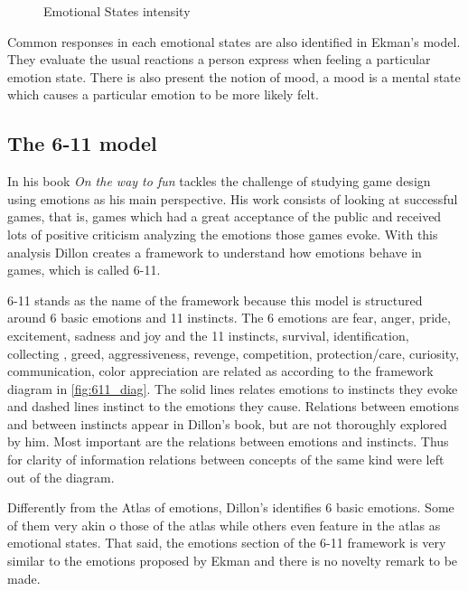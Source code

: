 \begin{figure}[!h]
    \caption{Emotional States intensity}
    \label{fig:emotionalstates}
\end{figure}


Common responses in each emotional states are also identified in Ekman's model. They evaluate the usual reactions a person express when feeling a particular emotion state. There is also present the notion of mood, a mood is a mental state which causes a particular emotion to be more likely felt. 

\subsection{The 6-11 model}

In his book \textit{On the way to fun} \citeauthor{dillon_way_2010} tackles the challenge of studying game design using emotions as his main perspective. His work consists of looking at successful games, that is, games which had a great acceptance of the public and received lots of positive criticism analyzing the emotions those games evoke. With this analysis Dillon creates a framework to understand how emotions behave in games, which is called 6-11.

6-11 stands as the name of the framework because this model is structured around 6 basic emotions and 11 instincts. The 6 emotions are fear, anger, pride, excitement, sadness and joy and the 11 instincts, survival, identification, collecting
, greed, aggressiveness, revenge, competition, protection/care, curiosity, communication, color appreciation are related as according to the framework diagram in \autoref{fig:611_diag}. The solid lines relates emotions to instincts they evoke and dashed lines instinct to the emotions they cause. Relations between emotions and between instincts appear in Dillon's book, but are not thoroughly explored by him. Most important are the relations between emotions and instincts. Thus for clarity of information relations between concepts of the same kind were left out of the diagram. 



Differently from the Atlas of emotions, Dillon's identifies 6 basic emotions. Some of them very akin o those of the atlas while others even feature in the atlas as emotional states. That said, the emotions section of the 6-11 framework is very similar to the emotions proposed by Ekman and there is no novelty remark to be made.

